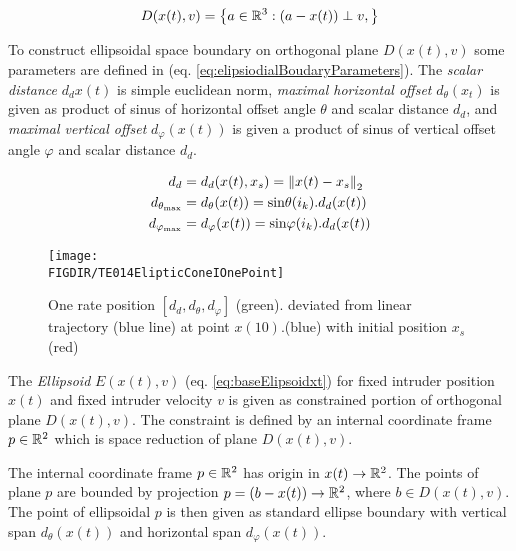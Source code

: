 \begin{equation}\label{eq:elisioidalOtrthogonalPlane}
    D({x}(t),{v})=\left\{{a}\in\mathbb{R}^3:({a}-{x}(t))\perp{v},\right\}
\end{equation}

To construct  ellipsoidal space boundary on orthogonal plane $D({x}(t),{v})$ some parameters are defined in (eq. \ref{eq:elipsiodialBoudaryParameters}). The \emph{scalar distance} $d_d{{x}(t)}$ is simple euclidean norm, \emph{maximal horizontal offset} $d_\theta({x}_t)$ is given as product of sinus of horizontal offset angle $\theta$ and scalar distance $d_d$, and \emph{maximal vertical offset} $d_\varphi({x}(t))$ is given a product of sinus of vertical offset angle $\varphi$ and scalar distance $d_d$.

\begin{equation}\label{eq:elipsiodialBoudaryParameters}
    \begin{aligned}
     d_d                      &=d_d({x}(t),{x}_s) =\left\lVert{x}(t)-{x}_s\right\rVert_2\\ 
     d_{\theta_{\text{max}}}  &= d_\theta({x}(t))=\text{sin}\theta   (i_k).d_d({x}(t))\\
     d_{\varphi_{\text{max}}} &= d_\varphi({x}(t))=\text{sin}\varphi (i_k).d_d({x}(t)) 
    \end{aligned}
\end{equation}

\begin{figure}[H]
    \centering
    \texttt{[image: \\FIGDIR/TE014ElipticConeIOnePoint]}         
    \caption{One rate position $[d_d,d_\theta,d_\varphi]$ (green). deviated from linear trajectory (blue line) at point ${x}(10)$.(blue) with initial position $x_s$ (red)}
    \label{fig:P21ElipticConeIOnePoint}
\end{figure}

\noindent The \emph{Ellipsoid} $E({x}(t),{v})$ (eq. \ref{eq:baseElipsoidxt}) for fixed intruder position ${x}(t)$ and fixed intruder velocity ${v}$ is given as constrained portion of orthogonal plane $D({x}(t),{v})$. The constraint is defined by an internal coordinate frame ${p}\in \mathbb{R}^2$ which is space reduction of plane $D({x}(t),{v})$. 

The internal coordinate frame ${p}\in\mathbb{R}^2$ has origin in ${x}(t)\to\mathbb{R}^2$. The points of plane ${p}$ are bounded by projection ${p}=({b}-{x}(t))\to\mathbb{R}^2$, where $b\in D({x}(t),v)$. The point of ellipsoidal ${p}$ is then given as standard ellipse boundary with vertical span $d_\theta({x}(t))$ and horizontal span $d_\varphi({x}(t))$. 

